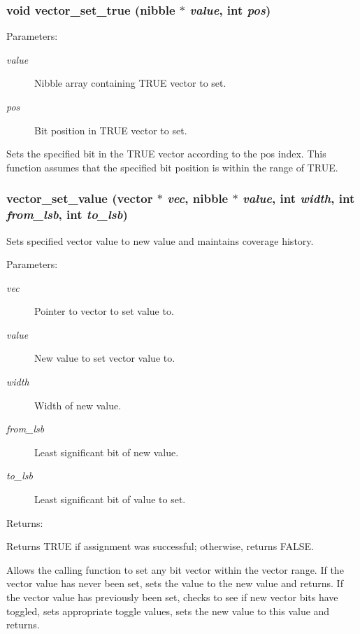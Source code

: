 \subsubsection{\setlength{\rightskip}{0pt plus 5cm}void vector\_\-set\_\-true ({\bf nibble} $\ast$ {\em value}, int {\em pos})}\label{vector_8c_a21}


\begin{Desc}
\item[Parameters: ]\par
\begin{description}
\item[{\em 
value}]Nibble array containing TRUE vector to set. \item[{\em 
pos}]Bit position in TRUE vector to set.\end{description}
\end{Desc}
Sets the specified bit in the TRUE vector according to the pos index. This function assumes that the specified bit position is within the range of TRUE. 
\subsubsection{ vector\_\-set\_\-value ({\bf vector} $\ast$ {\em vec}, {\bf nibble} $\ast$ {\em value}, int {\em width}, int {\em from\_\-lsb}, int {\em to\_\-lsb})}\label{vector_8c_a24}


Sets specified vector value to new value and maintains coverage history.

\begin{Desc}
\item[Parameters: ]\par
\begin{description}
\item[{\em 
vec}]Pointer to vector to set value to. \item[{\em 
value}]New value to set vector value to. \item[{\em 
width}]Width of new value. \item[{\em 
from\_\-lsb}]Least significant bit of new value. \item[{\em 
to\_\-lsb}]Least significant bit of value to set. \end{description}
\end{Desc}
\begin{Desc}
\item[Returns: ]\par
Returns TRUE if assignment was successful; otherwise, returns FALSE.\end{Desc}
Allows the calling function to set any bit vector within the vector range. If the vector value has never been set, sets the value to the new value and returns. If the vector value has previously been set, checks to see if new vector bits have toggled, sets appropriate toggle values, sets the new value to this value and returns. 
